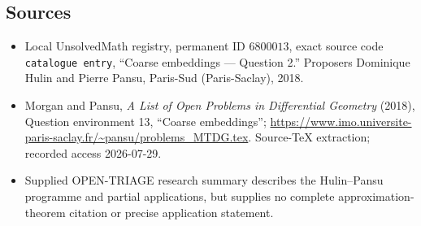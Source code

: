 \documentclass[11pt]{article}
\begin{document}
\subsection{Sources}
\begin{itemize}
\item Local UnsolvedMath registry, permanent ID \(6800013\), exact source code \texttt{catalogue entry}, ``Coarse embeddings --- Question 2.'' Proposers Dominique Hulin and Pierre Pansu, Paris-Sud (Paris-Saclay), 2018.
\item Morgan and Pansu, \emph{A List of Open Problems in Differential Geometry} (2018), Question environment 13, ``Coarse embeddings''; \url{https://www.imo.universite-paris-saclay.fr/~pansu/problems_MTDG.tex}. Source-TeX extraction; recorded access 2026-07-29.
\item Supplied OPEN-TRIAGE research summary describes the Hulin--Pansu programme and partial applications, but supplies no complete approximation-theorem citation or precise application statement.
\end{itemize}
\end{document}
